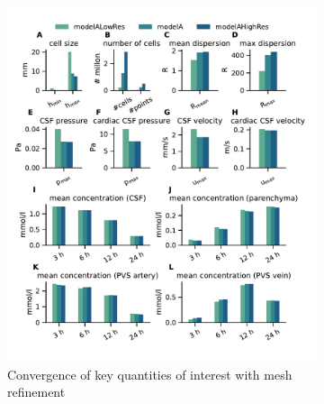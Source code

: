 \begin{figure}
    \centering
    \begin{subfigure}[b]{0.49\textwidth}
        \centering
        \includegraphics[trim={0.5cm 1cm 0.05cm 0.8cm}, clip, width = 1.05 \linewidth]{figures/modelALowRes_modelA_modelAHighRes.pdf}
        \caption*{Convergence of key quantities of interest with mesh refinement}
    \end{subfigure}
    \begin{subfigure}[b]{0.49\textwidth}
        \centering

\end{subfigure}
\end{figure}
